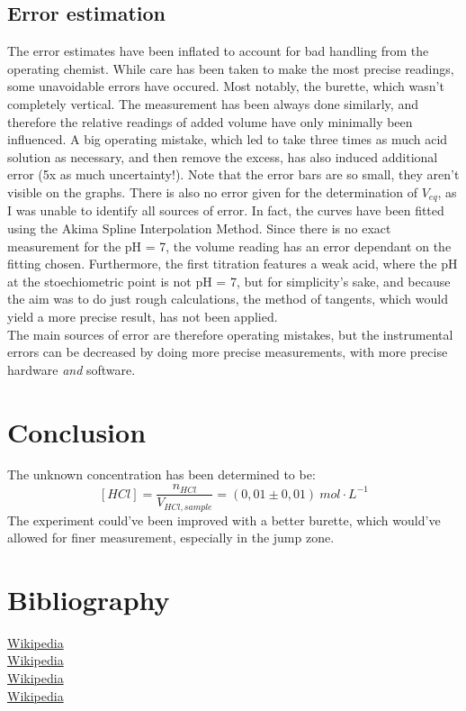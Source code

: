 \documentclass[twocolumn]{article}
\begin{document}
\subsection{Error estimation}
The error estimates have been inflated to account for bad handling from the operating chemist. While care has been taken to make the most precise readings, some unavoidable errors have occured.
Most notably, the burette, which wasn't completely vertical. The measurement has been always done similarly, and therefore the relative readings of added volume have only minimally been influenced. A big operating mistake, which led to take three times as much acid solution as necessary, and then remove the excess, has also induced additional error (5x as much uncertainty!). Note that the error bars are so small, they aren't visible on the graphs. 
There is also no error given for the determination of $V_{eq}$, as I was unable to identify all sources of error. In fact, the curves have been fitted using the Akima Spline Interpolation Method. Since there is no exact measurement for the pH = 7, the volume reading has an error dependant on the fitting chosen. Furthermore, the first titration features a weak acid, where the pH at the stoechiometric point is not pH = 7, but for simplicity's sake, and because the aim was to do just rough calculations, the method of tangents, which would yield a more precise result, has not been applied. \\
The main sources of error are therefore operating mistakes, but the instrumental errors can be decreased by doing more precise measurements, with more precise hardware \textit{and} software.
\section{Conclusion}
The unknown concentration has been determined to be:
\[ [HCl] = \frac{n_{HCl}}{V_{HCl,sample}} = (0,01 \pm 0,01) \ mol \cdot L^{-1} \]
The experiment could've been improved with a better burette, which would've allowed for finer measurement, especially in the jump zone.
\section{Bibliography}
\text{[1]} \href{https://en.wikipedia.org/wiki/Sodium_hydroxide}{Wikipedia} \\
\text{[2]} \href{https://en.wikipedia.org/wiki/Hydrogen_chloride}{Wikipedia} \\
\text{[3]}\href{https://en.wikipedia.org/wiki/Potassium_hydrogen_phthalate}{{Wikipedia}} \\
\text{[4]} \href{https://en.wikipedia.org/wiki/Phenolphthalein}{{Wikipedia}}
\end{document}
